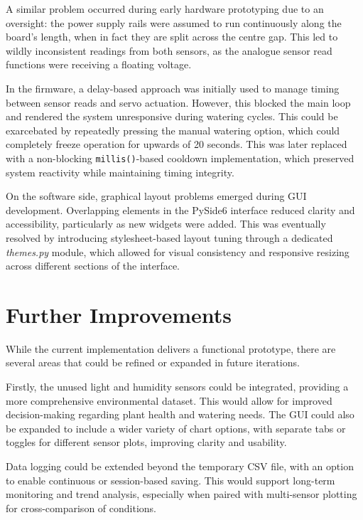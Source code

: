 \documentclass[a4paper,11pt]{article}
\begin{document}
A similar problem occurred during early hardware prototyping due to an oversight: 
the power supply rails were assumed to run continuously along the board's length, 
when in fact they are split across the centre gap. 
This led to wildly inconsistent readings from both sensors,
as the analogue sensor read functions were receiving a floating voltage.

In the firmware, a delay-based approach was initially used 
to manage timing between sensor reads and servo actuation. 
However, this blocked the main loop and rendered the system unresponsive 
during watering cycles. 
This could be exarcebated by repeatedly pressing the manual watering option,
which could completely freeze operation for upwards of 20 seconds.
This was later replaced with a non-blocking \texttt{millis()}-based cooldown implementation, 
which preserved system reactivity while maintaining timing integrity.

On the software side, graphical layout problems emerged during GUI development. 
Overlapping elements in the PySide6 interface reduced clarity and accessibility, 
particularly as new widgets were added. 
This was eventually resolved by introducing stylesheet-based layout tuning 
through a dedicated \textit{themes.py} module, 
which allowed for visual consistency and 
responsive resizing across different sections of the interface.

\section{Further Improvements}
\label{sec:further_improvements}

While the current implementation delivers a functional prototype, 
there are several areas that could be refined or expanded in future iterations.

Firstly, the unused light and humidity sensors could be integrated, 
providing a more comprehensive environmental dataset. 
This would allow for improved decision-making regarding plant health and watering needs. 
The GUI could also be expanded to include a wider variety of chart options, 
with separate tabs or toggles for different sensor plots, improving clarity and usability.

Data logging could be extended beyond the temporary CSV file, 
with an option to enable continuous or session-based saving. 
This would support long-term monitoring and trend analysis, 
especially when paired with multi-sensor plotting for cross-comparison of conditions.
\end{document}
